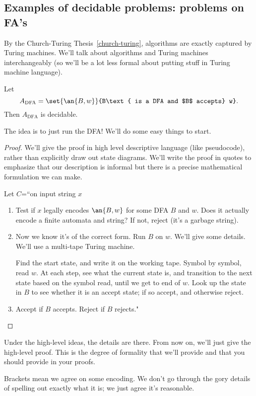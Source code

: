 \subsection{Examples of decidable problems: problems on FA's}
By the Church-Turing Thesis~\ref{church-turing}, algorithms are exactly captured by Turing machines. We'll talk about algorithms and Turing machines interchangeably (so we'll be a lot less formal about putting stuff in Turing machine language).

\begin{thm}
Let 
\[
A_{\text{DFA}}=\set{\an{B,w}}{B\text{ is a DFA and $B$ accepts} w}.
\]
Then $A_{\text{DFA}}$ is decidable. 
\end{thm}
The idea is to just run the DFA! We'll do some easy things to start.
\begin{proof}
We'll %
give the proof in high level descriptive language (like pseudocode), rather than explicitly draw out state diagrams. We'll write the proof in quotes to emphasize that our description is informal but there is a precise mathematical formulation we can make.

Let $C$=``on input string $x$ 
\begin{enumerate}
\item
Test if $x$ legally encodes $\an{B,w}$ for some DFA $B$ and $w$. Does it actually encode a finite automata and string? If not,  reject (it's a garbage string).
\item  Now we know it's of the correct form.
Run $B$ on $w$. We'll give some details. We'll use a multi-tape Turing machine.


Find the start state, and write it on the working tape. Symbol by symbol, read $w$. At each step, see what the current state is, and transition to the next state based on the symbol read, until we get to end of $w$.  Look up the state in $B$ to see whether it is an accept state; if so accept, and otherwise reject.
\item Accept if $B$ accepts. Reject if $B$ rejects."
\end{enumerate}
\end{proof}

Under the high-level ideas, the details are there. From now on, we'll just give the high-level proof. This is the degree of formality that we'll provide and that you should provide in your proofs.

Brackets mean we agree on some encoding. We don't go through the gory details of spelling out exactly what it is; we just agree it's reasonable. 

